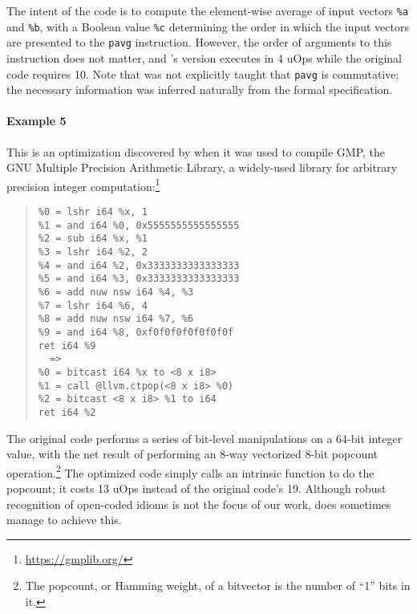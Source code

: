 The intent of the code is to compute the element-wise average of input
vectors \texttt{\%a} and \texttt{\%b}, with a Boolean value
\texttt{\%c} determining the order in which the input vectors are
presented to the \texttt{pavg} instruction.
%
However, the order of arguments to this instruction does not matter, and
\tool's version executes in 4 uOps while the original code requires
10.
%
Note that \tool{} was not explicitly taught that \texttt{pavg} is
commutative; the necessary information was inferred naturally from the
formal specification.


\paragraph{Example 5}

This is an optimization discovered
by \tool{} when it was used to compile GMP, the GNU Multiple Precision
Arithmetic Library, a widely-used library for arbitrary precision
integer computation:\footnote{\url{https://gmplib.org/}}


{\small\begin{quote}\begin{verbatim}
%0 = lshr i64 %x, 1
%1 = and i64 %0, 0x5555555555555555
%2 = sub i64 %x, %1
%3 = lshr i64 %2, 2
%4 = and i64 %2, 0x3333333333333333
%5 = and i64 %3, 0x3333333333333333
%6 = add nuw nsw i64 %4, %3
%7 = lshr i64 %6, 4
%8 = add nuw nsw i64 %7, %6
%9 = and i64 %8, 0xf0f0f0f0f0f0f0f
ret i64 %9
  =>
%0 = bitcast i64 %x to <8 x i8>
%1 = call @llvm.ctpop(<8 x i8> %0)
%2 = bitcast <8 x i8> %1 to i64
ret i64 %2
\end{verbatim}
\end{quote}}
%
%
The original code performs a series of bit-level
manipulations on a 64-bit integer value, with the net result of
performing an 8-way vectorized 8-bit popcount operation.\footnote{The
popcount, or Hamming weight, of a bitvector is the number of ``1''
bits in it.}
%
The optimized code simply calls an intrinsic function to do the
popcount; it costs 13 uOps instead of the original code's 19.
%
Although robust recognition of open-coded idioms is not the focus
of our work, \tool{} does sometimes manage to achieve this.



